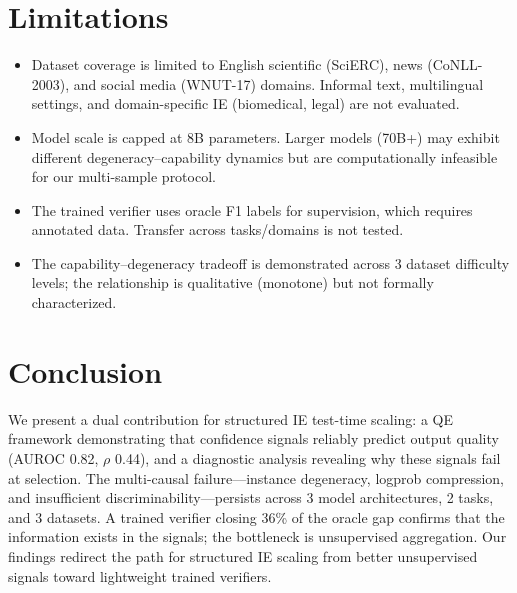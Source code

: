 \documentclass[11pt,a4paper]{article}
\begin{document}
\section{Limitations}

\begin{itemize}
    \item Dataset coverage is limited to English scientific (SciERC), news (CoNLL-2003), and social media (WNUT-17) domains. Informal text, multilingual settings, and domain-specific IE (biomedical, legal) are not evaluated.
    \item Model scale is capped at 8B parameters. Larger models (70B+) may exhibit different degeneracy--capability dynamics but are computationally infeasible for our multi-sample protocol.
    \item The trained verifier uses oracle F1 labels for supervision, which requires annotated data. Transfer across tasks/domains is not tested.
    \item The capability--degeneracy tradeoff is demonstrated across 3 dataset difficulty levels; the relationship is qualitative (monotone) but not formally characterized.
\end{itemize}

\section{Conclusion}

We present a dual contribution for structured IE test-time scaling: a QE framework demonstrating that confidence signals reliably predict output quality (AUROC 0.82, $\rho$ 0.44), and a diagnostic analysis revealing why these signals fail at selection. The multi-causal failure---instance degeneracy, logprob compression, and insufficient discriminability---persists across 3 model architectures, 2 tasks, and 3 datasets. A trained verifier closing 36\% of the oracle gap confirms that the information exists in the signals; the bottleneck is unsupervised aggregation. Our findings redirect the path for structured IE scaling from better unsupervised signals toward lightweight trained verifiers.
\end{document}
